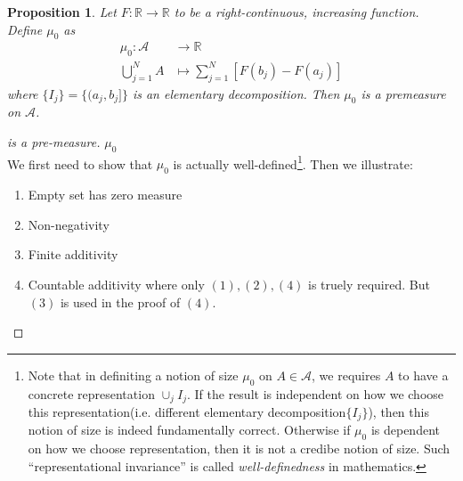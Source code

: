 \documentclass[a4paper,11pt,oneside]{book}
\newtheorem{proposition}{Proposition}[section]
\begin{document}
\begin{proposition}Let $F:\mathbb{R}\to\mathbb{R}$ to be a right-continuous, increasing function. Define $\mu_0$ as
\begin{equation}
\begin{aligned}
\mu_0 : \mathcal A &\to \mathbb{R} \\
\bigcup_{j=1}^N A &\mapsto \sum_{j=1}^N [F(b_j)-F(a_j)]
\end{aligned}
\end{equation}
where $\{I_j\}=\{(a_j,b_j]\}$ is an elementary decomposition. Then $\mu_0$ is a premeasure on $\mathcal A$.

\end{proposition}\begin{proof}[ is a pre-measure]\textbf{$\mu_0$}\\
We first need to show that $\mu_0$ is actually well-defined\footnote{Note that in definiting a notion of size $\mu_0$ on $A\in \mathcal A$, we requires $A$ to have a concrete representation $\cup_j I_j$. If the result is independent on
how we choose this representation(i.e. different elementary decomposition$\{I_j\}$), then this notion of size is indeed fundamentally correct. Otherwise if $\mu_0$ is dependent on how we choose representation, then it is not a credibe notion of size. Such ``representational invariance'' is called \textit{well-definedness} in mathematics.}. Then we illustrate:

\begin{enumerate}
\item Empty set has zero measure
\item Non-negativity
\item Finite additivity
\item Countable additivity
where only $(1),(2),(4)$ is truely required. But $(3)$ is used in the proof of $(4)$.
\end{enumerate}

\end{proof}
\end{document}
